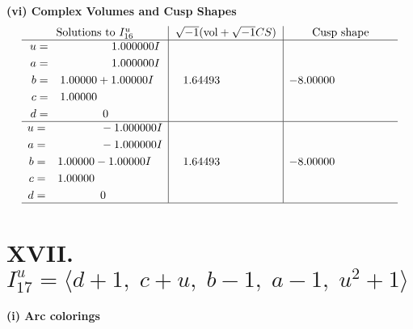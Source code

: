 \documentclass[1p]{elsarticle_modified}
\theoremstyle{definition}
\newcommand{\I}{\sqrt{-1}}
\begin{document}
\newpage\flushleft \textbf{(vi) Complex Volumes and Cusp Shapes}
$$\begin{array}{c|c|c}  
\text{Solutions to }I^u_{16}& \I (\text{vol} + \sqrt{-1}CS) & \text{Cusp shape}\\
 \hline 
\begin{aligned}
u &= \phantom{-0.000000 -}1.000000 I \\
a &= \phantom{-0.000000 -}1.000000 I \\
b &= \phantom{-}1.00000 + 1.00000 I \\
c &= \phantom{-}1.00000\phantom{ +0.000000I} \\
d &= \phantom{-0.000000 } 0\end{aligned}
 & \phantom{-}1.64493\phantom{ +0.000000I} & -8.00000\phantom{ +0.000000I} \\ \hline\begin{aligned}
u &= \phantom{-0.000000 } -1.000000 I \\
a &= \phantom{-0.000000 } -1.000000 I \\
b &= \phantom{-}1.00000 - 1.00000 I \\
c &= \phantom{-}1.00000\phantom{ +0.000000I} \\
d &= \phantom{-0.000000 } 0\end{aligned}
 & \phantom{-}1.64493\phantom{ +0.000000I} & -8.00000\phantom{ +0.000000I}\\
 \hline 
 \end{array}$$\newpage\newpage\renewcommand{\arraystretch}{1}
\centering \section*{XVII. $I^u_{17}= \langle d+1,\;c+u,\;b-1,\;a-1,\;u^2+1 \rangle$}
\flushleft \textbf{(i) Arc colorings}\\
\end{document}

